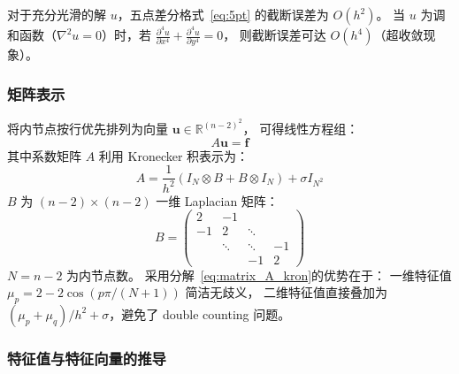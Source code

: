 \begin{theorem}[五点差分格式的截断误差]
  \label{thm:5pt_truncation}
  对于充分光滑的解 $u$，五点差分格式~\eqref{eq:5pt} 的截断误差为 $O(h^2)$。
  当 $u$ 为调和函数（$\nabla^2 u = 0$）时，若 $\frac{\partial^4 u}{\partial x^4} + \frac{\partial^4 u}{\partial y^4} = 0$，
  则截断误差可达 $O(h^4)$（超收敛现象）。
\end{theorem}

\subsubsection{矩阵表示}

将内节点按行优先排列为向量 $\mathbf{u} \in \mathbb{R}^{(n-2)^2}$，
可得线性方程组：
\begin{equation}
  A\mathbf{u} = \mathbf{f}
  \label{eq:linear-system}
\end{equation}
其中系数矩阵 $A$ 利用 Kronecker 积表示为：
\begin{equation}
  A = \frac{1}{h^2}(I_{N} \otimes B + B \otimes I_{N}) + \sigma I_{N^2}
  \label{eq:matrix_A_kron}
\end{equation}
$B$ 为 $(n-2) \times (n-2)$ 一维 Laplacian 矩阵：
\begin{equation}
  B = \begin{pmatrix}
    2 & -1 & & \\
    -1 & 2 & \ddots & \\
    & \ddots & \ddots & -1 \\
    & & -1 & 2
  \end{pmatrix}
  \label{eq:B_matrix}
\end{equation}
$N = n-2$ 为内节点数。
采用分解~\eqref{eq:matrix_A_kron}的优势在于：
一维特征值 $\mu_p = 2-2\cos(p\pi/(N+1))$ 简洁无歧义，
二维特征值直接叠加为 $(\mu_p+\mu_q)/h^2+\sigma$，避免了 double counting 问题。

\subsubsection{特征值与特征向量的推导}

